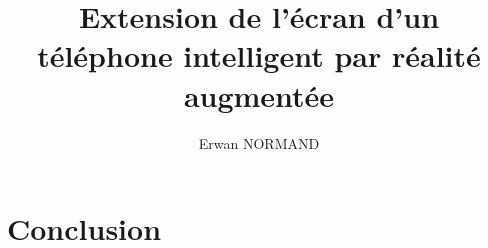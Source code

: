 \documentclass[letterpaper, twoside, 12pt,%
 memoire, french, creativecommons, hyperref, withAlgo2e%
]{thETS}
\title{Extension de l'écran d'un téléphone intelligent par réalité augmentée}
\author{Erwan NORMAND}
\begin{document}
\maketitle
\presentjury

\begin{avantpropos}
  
\end{avantpropos}

\begin{remerciements}
  
\end{remerciements}



\tableofcontents
\listoftables
\listoffigures
\lstlistoflistings

\begin{listofabbr}[3cm]
  
\end{listofabbr}

\cleardoublepage

\reversemarginpar
\setcounter{footnote}{0}

\begin{introduction}
  
\end{introduction}







\chapter*{Conclusion}
\label{ch:conclusion}


\appendix
\multiannexe




\newpage
\begin{spacing}{1}
  
  
\end{spacing}
\end{document}
